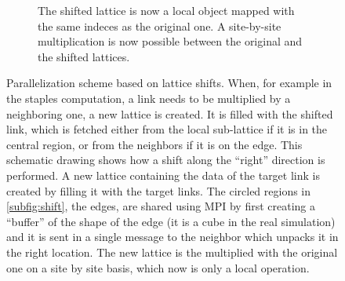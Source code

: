 \begin{figure}[hbt!]
\begin{subfigure}{\textwidth}
        \caption{The shifted lattice is now a local object mapped with the same indeces as the original one. A site-by-site multiplication is now possible between the original and the shifted lattices.}
    \end{subfigure}
    \caption{Parallelization scheme based on lattice shifts. When, for example in the staples computation, a link needs to be multiplied by a neighboring one, a new lattice is created. It is filled with the shifted link, which is fetched either from the local sub-lattice if it is in the central region, or from the neighbors if it is on the edge. This schematic drawing shows how a shift along the ``right'' direction is performed. A new lattice containing the data of the target link is created by filling it with the target links. The circled regions in \cref{subfig:shift}, the edges, are shared using MPI by first creating a ``buffer'' of the shape of the edge (it is a cube in the real simulation) and it is sent in a single message to the neighbor which unpacks it in the right location. The new lattice is the multiplied with the original one on a site by site basis, which now is only a local operation.}
    \label{fig:shift}
\end{figure}